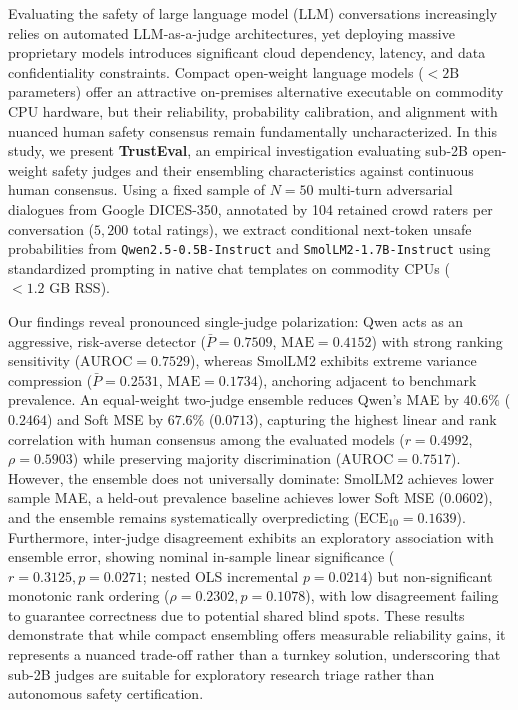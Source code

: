 Evaluating the safety of large language model (LLM) conversations increasingly relies on automated LLM-as-a-judge architectures, yet deploying massive proprietary models introduces significant cloud dependency, latency, and data confidentiality constraints. Compact open-weight language models ($<2\text{B}$ parameters) offer an attractive on-premises alternative executable on commodity CPU hardware, but their reliability, probability calibration, and alignment with nuanced human safety consensus remain fundamentally uncharacterized. In this study, we present \textbf{TrustEval}, an empirical investigation evaluating sub-2B open-weight safety judges and their ensembling characteristics against continuous human consensus. Using a fixed sample of $N=50$ multi-turn adversarial dialogues from Google DICES-350, annotated by 104 retained crowd raters per conversation ($5,200$ total ratings), we extract conditional next-token unsafe probabilities from \texttt{Qwen2.5-0.5B-Instruct} and \texttt{SmolLM2-1.7B-Instruct} using standardized prompting in native chat templates on commodity CPUs ($<1.2\text{ GB}$ RSS). 

Our findings reveal pronounced single-judge polarization: Qwen acts as an aggressive, risk-averse detector ($\bar{P}=0.7509$, $\text{MAE}=0.4152$) with strong ranking sensitivity ($\text{AUROC}=0.7529$), whereas SmolLM2 exhibits extreme variance compression ($\bar{P}=0.2531$, $\text{MAE}=0.1734$), anchoring adjacent to benchmark prevalence. An equal-weight two-judge ensemble reduces Qwen's MAE by $40.6\%$ ($0.2464$) and Soft MSE by $67.6\%$ ($0.0713$), capturing the highest linear and rank correlation with human consensus among the evaluated models ($r=0.4992$, $\rho=0.5903$) while preserving majority discrimination ($\text{AUROC}=0.7517$). However, the ensemble does not universally dominate: SmolLM2 achieves lower sample MAE, a held-out prevalence baseline achieves lower Soft MSE ($0.0602$), and the ensemble remains systematically overpredicting ($\text{ECE}_{10}=0.1639$). Furthermore, inter-judge disagreement exhibits an exploratory association with ensemble error, showing nominal in-sample linear significance ($r=0.3125, p=0.0271$; nested OLS incremental $p=0.0214$) but non-significant monotonic rank ordering ($\rho=0.2302, p=0.1078$), with low disagreement failing to guarantee correctness due to potential shared blind spots. These results demonstrate that while compact ensembling offers measurable reliability gains, it represents a nuanced trade-off rather than a turnkey solution, underscoring that sub-2B judges are suitable for exploratory research triage rather than autonomous safety certification.
